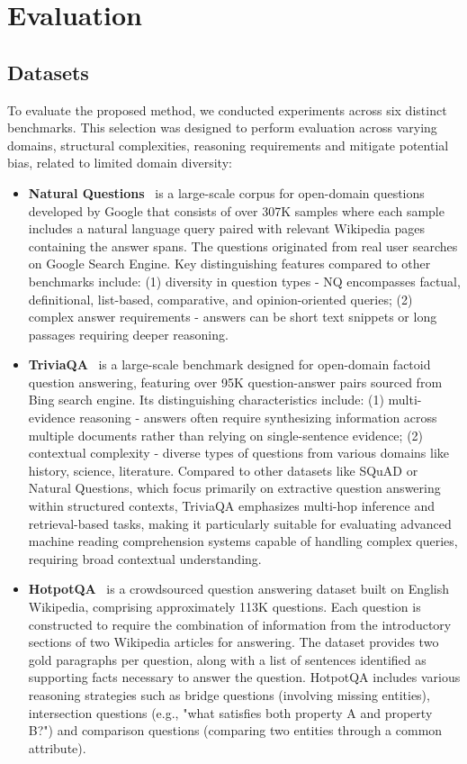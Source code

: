 \section{Evaluation}

\subsection{Datasets}

To evaluate the proposed method, we conducted experiments across six distinct benchmarks. This selection was designed to perform evaluation across varying domains, structural complexities, reasoning requirements and mitigate potential bias, related to limited domain diversity:
\begin{itemize}
    \item \textbf{Natural Questions}~\cite{kwiatkowski-etal-2019-natural} is a large-scale corpus for open-domain questions developed by Google that consists of over 307K samples where each sample includes a natural language query paired with relevant Wikipedia pages containing the answer spans. The questions originated from real user searches on Google Search Engine. Key distinguishing features compared to other benchmarks include: (1) diversity in question types - NQ encompasses factual, definitional, list-based, comparative, and opinion-oriented queries; (2) complex answer requirements - answers can be short text snippets or long passages requiring deeper reasoning.
    \item \textbf{TriviaQA}~\cite{joshi-etal-2017-triviaqa} is a large-scale benchmark designed for open-domain factoid question answering, featuring over 95K question-answer pairs sourced from Bing search engine. Its distinguishing characteristics include: (1) multi-evidence reasoning - answers often require synthesizing information across multiple documents rather than relying on single-sentence evidence; (2) contextual complexity - diverse types of questions from various domains like history, science, literature. Compared to other datasets like SQuAD or Natural Questions, which focus primarily on extractive question answering within structured contexts, TriviaQA emphasizes multi-hop inference and retrieval-based tasks, making it particularly suitable for evaluating advanced machine reading comprehension systems capable of handling complex queries, requiring broad contextual understanding.
    \item \textbf{HotpotQA}~\cite{yang-etal-2018-hotpotqa} is a crowdsourced question answering dataset built on English Wikipedia, comprising approximately 113K questions. Each question is constructed to require the combination of information from the introductory sections of two Wikipedia articles for answering. The dataset provides two gold paragraphs per question, along with a list of sentences identified as supporting facts necessary to answer the question. HotpotQA includes various reasoning strategies such as bridge questions (involving missing entities), intersection questions (e.g., "what satisfies both property A and property B?") and comparison questions (comparing two entities through a common attribute).

\end{itemize}
